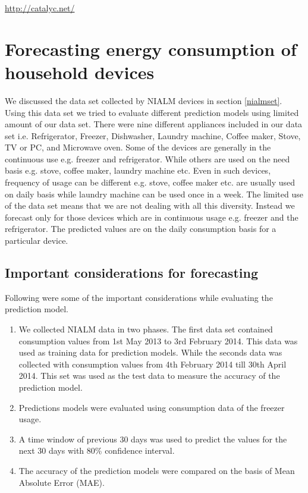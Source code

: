 \begin{center}
\url{http://catalyc.net/}\end{center}

\section{Forecasting energy consumption of household devices}
We discussed the data set collected by NIALM devices in section \ref{nialmset}. Using this data set we tried to evaluate different prediction models using limited amount of our data set. There were nine different appliances included in our data set i.e. Refrigerator, Freezer, Dishwasher, Laundry machine, Coffee maker, Stove, TV or PC, and Microwave oven. Some of the devices are generally in the continuous use e.g. freezer and refrigerator. While others are used on the need basis e.g. stove, coffee maker, laundry machine etc. Even in such devices, frequency of usage can be different e.g. stove, coffee maker etc. are usually used on daily basis while laundry machine can be used once in a week. The limited use of the data set means that we are not dealing with all this diversity. Instead we forecast only for those devices which are in continuous usage e.g. freezer and the refrigerator. The predicted values are on the daily consumption basis for a particular device.  
\subsection{Important considerations for forecasting}
Following were some of the important considerations while evaluating the prediction model.
\begin{enumerate}
\item We collected NIALM data in two phases. The first data set contained consumption values from 1st May 2013 to 3rd February 2014. This data was used as training data for prediction models. While the seconds data was collected with consumption values from 4th February 2014 till 30th April 2014. This set was used as the test data to measure the accuracy of the prediction model.
\item Predictions models were evaluated using consumption data of the freezer usage.
\item A time window of previous 30 days was used to predict the values for the next 30 days with 80\% confidence interval.
\item  The accuracy of the prediction models were compared on the basis of Mean Absolute Error (MAE).
\end{enumerate}     

